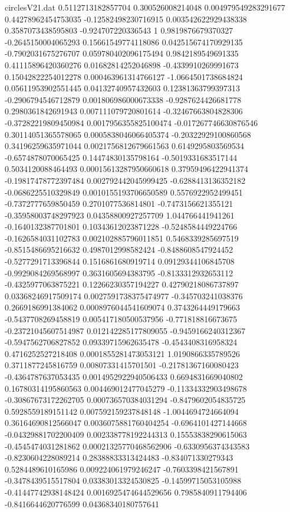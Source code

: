 \begin{filecontents}{circlesV21.dat}
0.5112713182857704	0.300526008214048	0.004979549283291677
0.44278962454753035	-0.12582498230716915	0.003542622929438338
0.3587073438595803	-0.924707220336543	1
0.9819876679370327	-0.2645150004065293	0.15661549774118086
0.042515674170929135	-0.7902031675276707	0.059780402096175494
0.9842189549691335	0.41115896420360276	0.01682814252046898
-0.4339910269991673	0.15042822254012278	0.000463961314766127
-1.0664501738684824	0.05611953902551445	0.04132740957432603
0.12381363799397313	-0.2906794546712879	0.001806986000673338
-0.9287624426681778	0.2980361842691943	0.007111079720801614
-0.32467663804828306	-0.37282219809450984	0.0017956355825100474
-0.017267746630876546	0.30114051365578065	0.0005838046066405374
-0.20322929100860568	0.34196259635971044	0.0021756812679661563
0.6149295803569534	-0.6574878070065425	0.14474830135798164
-0.5019331683517144	0.5034120088464493	0.00015613287950660618
0.37959496422941374	-0.19817478772397484	0.002792442045999425
-0.6288413136352182	-0.0686225510329849	0.0010155193706650589
0.5576922952499451	-0.7372777659850459	0.2701077536814801
-0.7473156621355121	-0.35958003748297923	0.04358800927257709
1.044766441941261	-0.1640132387701801	0.10343612023871228
-0.5248584449224766	-0.1626584031102783	0.002102885796011851
0.5468339285697519	-0.8515486695216632	0.4987012998582424
-0.8488608547924452	-0.5277291713396844	0.1516861680919714
0.09129344106845708	-0.9929084269568997	0.3631605694383795
-0.8133312932653112	-0.4325977063875221	0.12266230357194227
0.42790218086737897	0.03368246917509174	0.0027591738375474977
-0.345703241038376	0.2669186991384062	0.0008976044541609074
0.3743264449179663	-0.5437708269458819	0.005417180500537956
-0.771818816673675	-0.23721045607514987	0.012142285177809055
-0.9459166240312367	-0.5947562706827852	0.09339715962635478
-0.4543408316958324	0.4716252527218408	0.0001855281473053121
1.0190866335789526	0.3711877245816759	0.00807331415701501
-0.21781367160080423	-0.4364787637053435	0.0014952922940506433
0.6694831669040802	0.16780314195860563	0.004469012477045279
-0.11334332903498678	-0.30867673172262705	0.000736570384031294
-0.8479602054835725	0.5928559189151142	0.007592159237848148
-1.0044694724664094	0.36164690812566047	0.0036075881760404254
-0.6964101427144668	-0.04329881702200409	0.002338778192244313
0.15553838290615063	-0.4545474031281862	0.00021325770468562906
-0.6330956374343583	-0.8230604228089214	0.28388833313424483
-0.834071330279343	0.5284489610165986	0.009224061979246247
-0.7603398421567891	-0.3478439515517804	0.03383013324530825
-0.14599715053105988	-0.41447742938148424	0.0016925474644529656
0.7985840911794406	-0.8416644620776599	0.04368340180757641

\end{filecontents}
